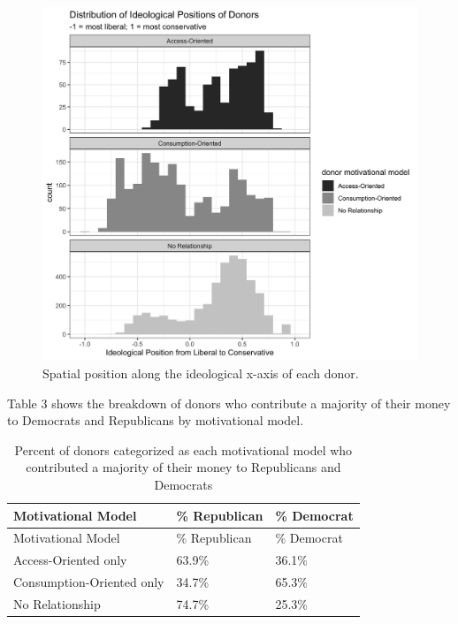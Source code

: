 \documentclass[12pt,]{article}
\begin{document}
\begin{figure}
\centering
\includegraphics{../tables_and_figures/fig_node_position.jpg}
\caption{Spatial position along the ideological x-axis of each donor.}
\end{figure}

Table 3 shows the breakdown of donors who contribute a majority of their
money to Democrats and Republicans by motivational model.

\begin{longtable}[]{@{}lll@{}}
\caption{Percent of donors categorized as each motivational model who
contributed a majority of their money to Republicans and
Democrats}\tabularnewline
\toprule
Motivational Model & \% Republican & \% Democrat\tabularnewline
\midrule
\endfirsthead
\toprule
Motivational Model & \% Republican & \% Democrat\tabularnewline
\midrule
\endhead
Access-Oriented only & 63.9\% & 36.1\%\tabularnewline
Consumption-Oriented only & 34.7\% & 65.3\%\tabularnewline
No Relationship & 74.7\% & 25.3\%\tabularnewline
\bottomrule
\end{longtable}
\end{document}
